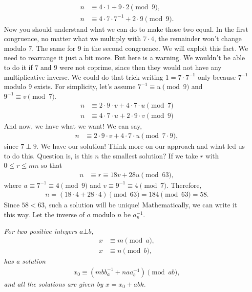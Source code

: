 \documentclass{subfile}
\begin{document}
		\begin{align*}
			n & \equiv4\cdot1+9\cdot2\pmod{9},\\
			n & \equiv4\cdot7\cdot7^{-1}+2\cdot9\pmod{9}.
		\end{align*}
	Now you should understand what we can do to make those two equal. In the first congruence, no matter what we multiply with $7\cdot4$, the remainder won't change modulo $7$. The same for $9$ in the second congruence. We will exploit this fact. We need to rearrange it just a bit more. But here is a warning. We wouldn't be able to do it if $7$ and $9$ were not coprime, since then they would not have any multiplicative inverse. We could do that trick writing $1=7\cdot7^{-1}$ only because $7^{-1}$ modulo $9$ exists. For simplicity, let's assume $7^{-1}\equiv u\pmod{9}$ and $9^{-1}\equiv v\pmod{7}$.
		\begin{align*}
			n & \equiv2\cdot9\cdot v+4\cdot7\cdot u\pmod{7}\\
			n & \equiv4\cdot7\cdot u+2\cdot9\cdot v\pmod{9}
		\end{align*}
	And now, we have what we want! We can say,
		\begin{align*}
			n & \equiv2\cdot9\cdot v+4\cdot7\cdot u\pmod{7\cdot9},
		\end{align*}
	since $7 \perp 9$. We have our solution! Think more on our approach and what led us to do this. Question is, is this $n$ the smallest solution? If we take $r$ with $0\leq r\leq mn$ so that
		\begin{align*}
			n & \equiv r\equiv18v+28u\pmod{63},
		\end{align*}
	where $u\equiv7^{-1}\equiv4\pmod9$ and $v\equiv9^{-1}\equiv4\pmod 7$. Therefore,
		\begin{align*}
			n = (18\cdot4+28\cdot4)\pmod{63}=184\pmod{63}=58.
		\end{align*}
	Since $58<63$, such a solution will be unique! Mathematically, we can write it this way. Let the inverse of $a$ modulo $n$ be $a^{-1}_n$.
		\begin{theorem}\slshape
			For two positive integers $a\bot b$,
				\begin{align*}
					x & \equiv m\pmod a,\\
					x & \equiv n\pmod b,
				\end{align*}
			has a solution 
				\begin{align*}
					x_0 \equiv (mbb^{-1}_a+naa^{-1}_b)\pmod{ab},
				\end{align*}
			and all the solutions are given by $x=x_0+abk$.
		\end{theorem}
\end{document}

